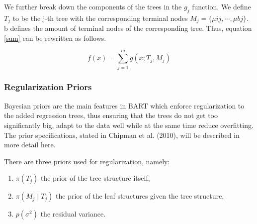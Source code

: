 \documentclass{usiinftr}
\begin{document}
We further break down the components of the trees in the $g_j$ function. We define $T_j$ to be the j-th tree with the corresponding terminal nodes $M_j = \{ \mu{ij}, \cdots, \mu{bj} \}$. b defines the amount of terminal nodes of the corresponding tree. Thus, equation \ref{sum} can be rewritten as follows.

\begin{equation} \label{sum1}
f(x)= \sum_{j=1}^{m} g(x;T_j,M_j)
\end{equation}

\subsubsection{Regularization Priors}\label{prior}
Bayesian priors are the main features in BART which enforce regularization to the added regression trees, thus ensuring that the trees do not get too significantly big, adapt to the data well while at the same time reduce overfitting. The prior specifications, stated in Chipman et al. (2010), will be described in more detail here.

There are three priors used for regularization, namely:
\begin{enumerate}
\item $\pi(T_j)$ the prior of the tree structure itself,
\item $\pi(M_j \mid T_j)$ the prior of the leaf structures given the tree structure, 
\item $p(\sigma^2)$ the residual variance.
\end{enumerate}
\end{document}
